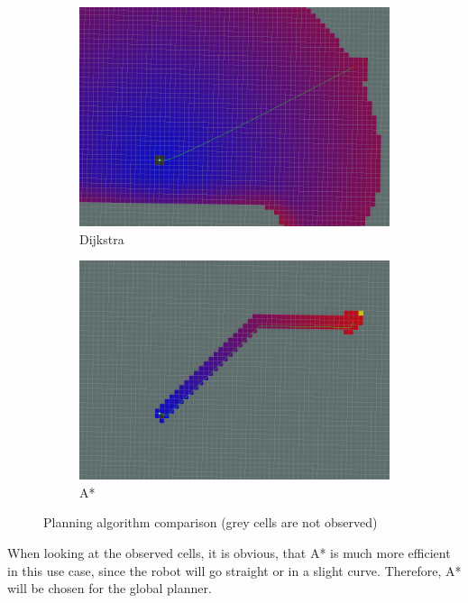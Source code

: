 \begin{figure} 
	\begin{subfigure}{.5\linewidth}
		\includegraphics[width=\textwidth]{Pictures/Dijkstra}
		\caption{Dijkstra}
	\end{subfigure}	
	\begin{subfigure}{.5\linewidth}
		\includegraphics[width=\textwidth]{Pictures/AStar2}
		\caption{A*}
	\end{subfigure}

	\caption{Planning algorithm comparison (grey cells are not observed)\cite{globalplanner}}
	\label{plannercomparison}

\end{figure}


When looking at the observed cells, it is obvious, that A* is much more efficient in this use case, since the robot will go straight or in a slight curve. Therefore, A* will be chosen for the global planner.\\

